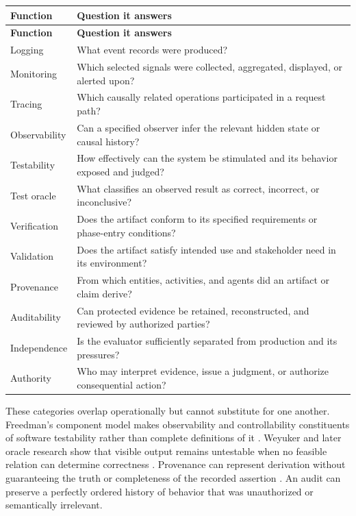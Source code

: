 \documentclass[10pt,a4paper]{article}
\begin{document}
\begin{longtable}{>{\raggedright\arraybackslash}p{}>{\raggedright\arraybackslash}p{}}
\hline
\textbf{Function} & \textbf{Question it answers} \\
\hline
\endfirsthead
\hline
\textbf{Function} & \textbf{Question it answers} \\
\hline
\endhead
Logging & What event records were produced? \\
Monitoring & Which selected signals were collected, aggregated, displayed, or alerted upon? \\
Tracing & Which causally related operations participated in a request path? \\
Observability & Can a specified observer infer the relevant hidden state or causal history? \\
Testability & How effectively can the system be stimulated and its behavior exposed and judged? \\
Test oracle & What classifies an observed result as correct, incorrect, or inconclusive? \\
Verification & Does the artifact conform to its specified requirements or phase-entry conditions? \\
Validation & Does the artifact satisfy intended use and stakeholder need in its environment? \\
Provenance & From which entities, activities, and agents did an artifact or claim derive? \\
Auditability & Can protected evidence be retained, reconstructed, and reviewed by authorized parties? \\
Independence & Is the evaluator sufficiently separated from production and its pressures? \\
Authority & Who may interpret evidence, issue a judgment, or authorize consequential action? \\
\hline
\end{longtable}

These categories overlap operationally but cannot substitute for one another. Freedman's component model makes observability and controllability constituents of software testability rather than complete definitions of it \cite{freedman1991}. Weyuker and later oracle research show that visible output remains untestable when no feasible relation can determine correctness \cite{weyuker1982,barr2015}. Provenance can represent derivation without guaranteeing the truth or completeness of the recorded assertion \cite{provdm2013}. An audit can preserve a perfectly ordered history of behavior that was unauthorized or semantically irrelevant.
\end{document}

